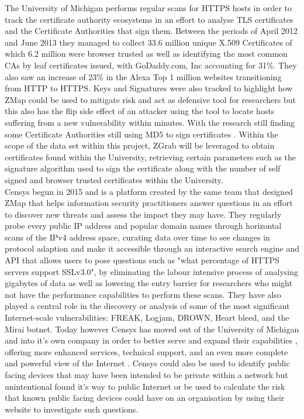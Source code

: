 \documentclass[a4wide,leqno,12pt]{report}
\begin{document}
The University of Michigan performs regular scans for HTTPS hosts\cite{durumeric2014internet} in order to track the certificate authority ecosystems in an effort to analyse TLS certificates and the Certificate Authorities that sign them. Between the periods of April 2012 and June 2013 they managed to collect 33.6 million unique X.509 Certificates of which 6.2 million were browser trusted as well as identifying the most common CAs by leaf certificates issued, with GoDaddy.com, Inc accounting for 31\%. They also saw an increase of 23\% in the Alexa Top 1 million websites \cite{top20161} transitioning from HTTP to HTTPS. Keys and Signatures were also tracked to highlight how ZMap could be used to mitigate risk and act as defensive tool for researchers but this also has the flip side effect of an attacker using the tool to locate hosts suffering from a new vulnerability within minutes\cite{durumeric2013zmap}. With the research still finding some Certificate Authorities still using MD5 to sign certificates \cite{durumeric2013analysis}. Within the scope of the data set within this project, ZGrab will be leveraged to obtain certificates found within the University, retrieving certain parameters such as the signature algorithm used to sign the certificate along with the number of self signed and browser trusted certificates within the University.\\

Censys begun in 2015 and is a platform created by the same team that designed ZMap that helps information security practitioners answer questions in an effort to discover new threats and assess the impact they may have. They regularly probe every public IP address and popular domain names through horizontal scans of the IPv4 address space, curating data over time to see changes in protocol adaption and make it accessible through an interactive search engine and API that allows users to pose questions such as "what percentage of HTTPS servers support SSLv3.0", by eliminating the labour intensive process of analysing gigabytes of data as well as lowering the entry barrier for researchers who might not have the performance capabilities to perform these scans\cite{durumeric2015search}. They have also played a central role in the discovery or analysis of some of the most significant Internet-scale vulnerabilities: FREAK, Logjam, DROWN, Heart bleed, and the Mirai botnet. Today however Censys has moved out of the University of Michigan and into it's own company in order to better serve and expand their capabilities , offering more enhanced services, technical support, and an even more complete and powerful view of the Internet \cite{censysWeb}.
Censys could also be used to identify public facing devices that may have been intended to be private within a network but unintentional found it's way to public Internet or be used to calculate the risk that known public facing devices could have on an organisation \cite{durumeric2015search} by using their website to investigate such questions.\\
\end{document}
